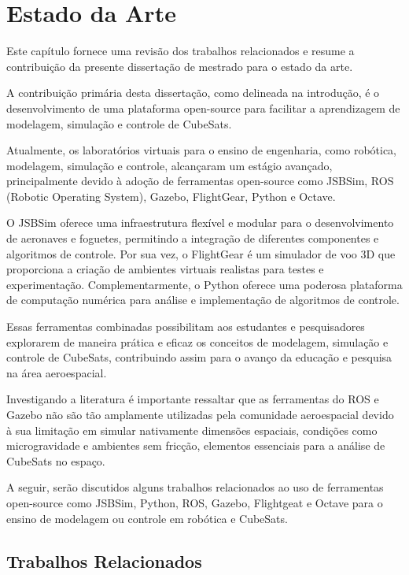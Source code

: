 \chapter{Estado da Arte}\label{cap:estArte}

Este capítulo fornece uma revisão dos trabalhos relacionados e resume a contribuição da presente dissertação de mestrado para o estado da arte.

A contribuição primária desta dissertação, como delineada na introdução, é o desenvolvimento de uma plataforma open-source para facilitar a aprendizagem de modelagem, simulação e controle de CubeSats.

Atualmente, os laboratórios virtuais para o ensino de engenharia, como robótica, modelagem, simulação e controle, alcançaram um estágio avançado, principalmente devido à adoção de ferramentas open-source como JSBSim, ROS (Robotic Operating System), Gazebo, FlightGear, Python e Octave.

O JSBSim oferece uma infraestrutura flexível e modular para o desenvolvimento de aeronaves e foguetes, permitindo a integração de diferentes componentes e algoritmos de controle. Por sua vez, o FlightGear é um simulador de voo 3D que proporciona a criação de ambientes virtuais realistas para testes e experimentação. Complementarmente, o Python oferece uma poderosa plataforma de computação numérica para análise e implementação de algoritmos de controle.

Essas ferramentas combinadas possibilitam aos estudantes e pesquisadores explorarem de maneira prática e eficaz os conceitos de modelagem, simulação e controle de CubeSats, contribuindo assim para o avanço da educação e pesquisa na área aeroespacial.

Investigando a literatura é importante ressaltar que as ferramentas do ROS e Gazebo não são tão amplamente utilizadas pela comunidade aeroespacial devido à sua limitação em simular nativamente dimensões espaciais, condições como microgravidade e ambientes sem fricção, elementos essenciais para a análise de CubeSats no espaço.

A seguir, serão discutidos alguns trabalhos relacionados ao uso de ferramentas open-source como JSBSim, Python, ROS, Gazebo, Flightgeat e Octave para o ensino de modelagem ou controle em robótica e CubeSats.

\section*{Trabalhos Relacionados}\label{sec:primTrab}

